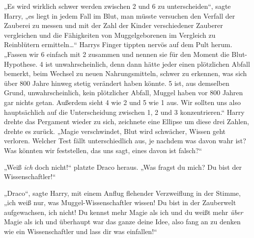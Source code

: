 „Es wird wirklich schwer werden zwischen 2 und 6 zu unterscheiden“, sagte Harry, „es liegt in jedem Fall im Blut, man müsste versuchen den Verfall der Zauberei zu messen und mit der Zahl der Kinder verschiedener Zauberer vergleichen und die Fähigkeiten von Muggelgeborenen im Vergleich zu Reinblütern ermitteln…“ Harrys Finger tippten nervös auf dem Pult herum. „Fassen wir 6 einfach mit 2 zusammen und nennen sie für den Moment die Blut-Hypothese. 4 ist unwahrscheinlich, denn dann hätte jeder einen plötzlichen Abfall bemerkt, beim Wechsel zu neuen Nahrungsmitteln, schwer zu erkennen, was sich über 800 Jahre hinweg stetig verändert haben könnte. 5 ist, aus demselben Grund, unwahrscheinlich, kein plötzlicher Abfall, Muggel haben vor 800 Jahren gar nichts getan. Außerdem sieht 4 wie 2 und 5 wie 1 aus. Wir sollten uns also hauptsächlich auf die Unterscheidung zwischen 1, 2 und 3 konzentrieren.“ Harry drehte das Pergament wieder zu sich, zeichnete eine Ellipse um diese drei Zahlen, drehte es zurück. „Magie verschwindet, Blut wird schwächer, Wissen geht verloren. Welcher Test fällt unterschiedlich aus, je nachdem was davon wahr ist? Was könnten wir feststellen, das uns sagt, eines davon ist falsch?“

„Weiß \emph{ich} doch nicht!“ platzte Draco heraus. „Was fragst du mich? Du bist der Wissenschaftler!“

„Draco“, sagte Harry, mit einem Anflug flehender Verzweiflung in der Stimme, „ich weiß nur, was Muggel-Wissenschaftler wissen! Du bist in der Zauberwelt aufgewachsen, ich nicht! Du kennst mehr Magie als ich und du weißt mehr \emph{über} Magie als ich und überhaupt war das ganze deine Idee, also fang an zu denken wie ein Wissenschaftler und lass dir was einfallen!“

